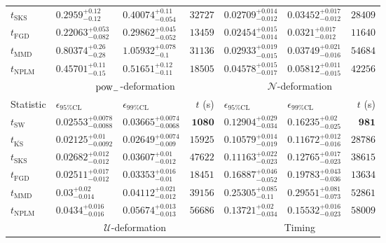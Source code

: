 \begin{tabular}{l|llr|llr}
	$t_{\mathrm{SKS}}$ & $0.2959_{-0.12}^{+0.12}$ & $0.40074_{-0.054}^{+0.11}$ & $32727$ & $0.02709_{-0.012}^{+0.014}$ & $0.03452_{-0.012}^{+0.017}$ & $28409$ \\
	$t_{\mathrm{FGD}}$ & ${\mathbf{0.22063_{-0.082}^{+0.053}}}$ & ${\mathbf{0.29862_{-0.052}^{+0.045}}}$ & $13459$ & $0.02454_{-0.014}^{+0.015}$ & $0.0321_{-0.012}^{+0.017}$ & $11640$ \\
	$t_{\mathrm{MMD}}$ & $0.80374_{-0.28}^{+0.26}$ & $1.05932_{-0.1}^{+0.078}$ & $31136$ & $0.02933_{-0.015}^{+0.019}$ & $0.03749_{-0.016}^{+0.021}$ & $54684$ \\
\rowcolor{red!35}	$t_{\mathrm{NPLM}}$ & $0.45701_{-0.15}^{+0.11}$ & $0.51651_{-0.11}^{+0.12}$ & $18505$ & $0.04578_{-0.017}^{+0.015}$ & $0.05812_{-0.015}^{+0.011}$ & $42256$ \\
	\toprule
	\multicolumn{1}{c}{} & \multicolumn{3}{c}{$\rm{pow}_{-}$-deformation} & \multicolumn{3}{c}{$\mathcal{N}$-deformation} \\
Statistic & $\epsilon_{95\%\mathrm{CL}}$ & $\epsilon_{99\%\mathrm{CL}}$ & $t$ (s) & $\epsilon_{95\%\mathrm{CL}}$ & $\epsilon_{99\%\mathrm{CL}}$ & $t$ (s) \\
	\midrule
	$t_{\mathrm{SW}}$ & $0.02553_{-0.0088}^{+0.0078}$ & $0.03665_{-0.0068}^{+0.0074}$ & ${\mathbf{1080}}$ & $0.12904_{-0.034}^{+0.029}$ & $0.16235_{-0.025}^{+0.02}$ & ${\mathbf{981}}$ \\
	$t_{\overline{\mathrm{KS}}}$ & ${\mathbf{0.02125_{-0.0092}^{+0.01}}}$ & ${\mathbf{0.02649_{-0.009}^{+0.0074}}}$ & $15925$ & ${\mathbf{0.10579_{-0.019}^{+0.014}}}$ & ${\mathbf{0.11672_{-0.016}^{+0.012}}}$ & $28786$ \\
	$t_{\mathrm{SKS}}$ & $0.02682_{-0.012}^{+0.012}$ & $0.03607_{-0.012}^{+0.01}$ & $47622$ & $0.11163_{-0.023}^{+0.022}$ & $0.12765_{-0.023}^{+0.017}$ & $38615$ \\
	$t_{\mathrm{FGD}}$ & $0.02511_{-0.012}^{+0.017}$ & $0.03353_{-0.01}^{+0.016}$ & $18451$ & $0.16887_{-0.052}^{+0.046}$ & $0.19783_{-0.036}^{+0.043}$ & $13634$ \\
	$t_{\mathrm{MMD}}$ & $0.03_{-0.014}^{+0.02}$ & $0.04112_{-0.012}^{+0.021}$ & $39156$ & $0.25305_{-0.11}^{+0.085}$ & $0.29551_{-0.073}^{+0.081}$ & $52861$ \\
\rowcolor{red!35}	$t_{\mathrm{NPLM}}$ & $0.0434_{-0.016}^{+0.016}$ & $0.05674_{-0.013}^{+0.013}$ & $56686$ & $0.13721_{-0.034}^{+0.02}$ & $0.15532_{-0.023}^{+0.016}$ & $58009$ \\
	\toprule
	\multicolumn{1}{c}{} & \multicolumn{3}{c}{$\mathcal{U}$-deformation} & \multicolumn{3}{c}{Timing} \\

\end{tabular}
